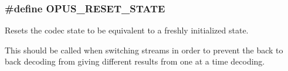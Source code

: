 \subsubsection[{\texorpdfstring{O\+P\+U\+S\+\_\+\+R\+E\+S\+E\+T\+\_\+\+S\+T\+A\+TE}{OPUS_RESET_STATE}}]{\setlength{\rightskip}{0pt plus 5cm}\#define O\+P\+U\+S\+\_\+\+R\+E\+S\+E\+T\+\_\+\+S\+T\+A\+TE}\hypertarget{group__opus__genericctls_gadc74e4fa8bcdf9994187d52d92207337}{}\label{group__opus__genericctls_gadc74e4fa8bcdf9994187d52d92207337}


Resets the codec state to be equivalent to a freshly initialized state. 

This should be called when switching streams in order to prevent the back to back decoding from giving different results from one at a time decoding. 